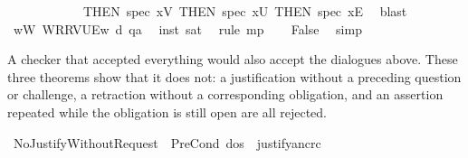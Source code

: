 \begin{isabellebody}
\ \ \ \ \ \ \ \ \ \ \ \ THEN\ spec{\isacharbrackleft}{\kern0pt}\ x{\isacharequal}{\kern0pt}{\isachardoublequoteopen}{\isacharquery}{\kern0pt}V{\isachardoublequoteclose}{\isacharbrackright}{\kern0pt}{\isacharcomma}{\kern0pt}\ THEN\ spec{\isacharbrackleft}{\kern0pt}\ x{\isacharequal}{\kern0pt}U{\isacharbrackright}{\kern0pt}{\isacharcomma}{\kern0pt}\ THEN\ spec{\isacharbrackleft}{\kern0pt}\ x{\isacharequal}{\kern0pt}E{\isacharbrackright}{\kern0pt}{\isacharbrackright}{\kern0pt}\ \isamarkupfalse%
\ blast\isanewline
\ \ \isamarkupfalse%
\ {\isachardoublequoteopen}{\isasymforall}w{\isacharcolon}{\kern0pt}{\isacharquery}{\kern0pt}W{\isachardot}{\kern0pt}\ {\isasymlangle}{\isacharquery}{\kern0pt}W{\isacharcomma}{\kern0pt}{\isacharquery}{\kern0pt}R{\isacharcomma}{\kern0pt}{\isacharquery}{\kern0pt}R{\isacharcomma}{\kern0pt}{\isacharquery}{\kern0pt}V{\isacharcomma}{\kern0pt}U{\isacharcomma}{\kern0pt}E{\isasymrangle}{\isacharcomma}{\kern0pt}w\ {\isasymTurnstile}\isactrlsup d\ q\isactrlsup a{\isachardoublequoteclose}\ \isamarkupfalse%
\ inst\ sat\ \isamarkupfalse%
\ {\isacharparenleft}{\kern0pt}rule\ mp{\isacharparenright}{\kern0pt}\isanewline
\ \ \isamarkupfalse%
\ False\ \isamarkupfalse%
\ simp\isanewline
{}\isamarkupfalse%
%
\endisatagproof
{\isafoldproof}%
%
\isadelimproof
%
\endisadelimproof
%
\isadelimdocument
%
\endisadelimdocument
%
\isatagdocument
%
\isamarkuptrue%
%
\endisatagdocument
{\isafolddocument}%
%
\isadelimdocument
%
\endisadelimdocument
%
\begin{isamarkuptext}%
A checker that accepted everything would also accept the dialogues above.
These three theorems show that it does not: a justification without a preceding
question or challenge, a retraction without a corresponding obligation, and an
assertion repeated while the obligation is still open are all rejected.%
\end{isamarkuptext}\isamarkuptrue%
\isamarkupfalse%
\ NoJustifyWithoutRequest{\isacharcolon}{\kern0pt}\ {\isachardoublequoteopen}{\isasymnot}\ PreCond\ dos\ {\isasymGamma}\ justify{\isacharbrackleft}{\kern0pt}a{\isacharcomma}{\kern0pt}n\isactrlsup c{\isasymturnstile}\isactrlsup {\isasymoplus}r\isactrlsup c{\isacharbrackright}{\kern0pt}{\isachardoublequoteclose}\isanewline
%
\isadelimproof

\end{isabellebody}
